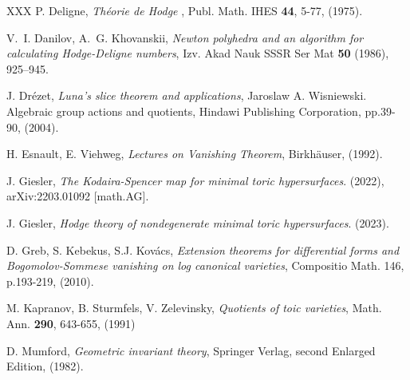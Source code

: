 \documentclass[12pt, english]{article}
\newcommand{\RNum}[1]{\uppercase\expandafter{\romannumeral #1\relax}}
\begin{document}
\begin{thebibliography}{XXX}
	 P. Deligne, \emph{{Théorie de Hodge \RNum{3}}}, Publ. Math. IHES {\bf 44}, 5-77, (1975). 
	
	
	 V.~I. Danilov, A.~G. Khovanskii,
	\emph{ Newton polyhedra and an algorithm for calculating
		Hodge-Deligne numbers},  Izv. Akad Nauk SSSR Ser Mat {\bf 50} (1986), 925--945.
	
		 J. Drézet, \emph{{Luna’s slice theorem and applications}}, Jaroslaw A. Wisniewski. Algebraic group	actions and quotients, Hindawi Publishing Corporation, pp.39-90, (2004).
	
		 H. Esnault, E. Viehweg, \emph{{Lectures on Vanishing Theorem}}, Birkh{\"a}user, (1992).

	 J. Giesler, \emph{{The Kodaira-Spencer map for minimal toric hypersurfaces}}. (2022),  arXiv:2203.01092 [math.AG].
	
	 J. Giesler, \emph{{Hodge theory of nondegenerate minimal toric hypersurfaces}}. (2023).
	
	
	
	
	
	 D. Greb, S. Kebekus, S.J. Kovács, \emph{{Extension theorems for differential forms and Bogomolov-Sommese vanishing on log canonical varieties}}, Compositio Math. 146, p.193-219, (2010).
	
		 M. Kapranov, B. Sturmfels, V. Zelevinsky, \emph{{Quotients of toic varieties}}, Math. Ann. {\bfseries 290}, 643-655, (1991)
	
	
		
	
		 D. Mumford, \emph{{Geometric invariant theory}}, Springer Verlag, second Enlarged Edition, (1982). 
	

\end{thebibliography}
\end{document}
